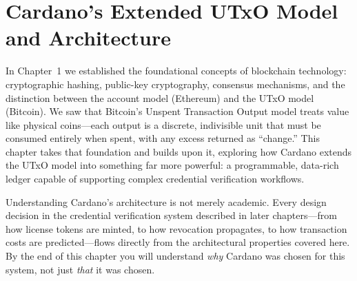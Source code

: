 %
%
%


\chapter{Cardano's Extended UTxO Model and Architecture}
\label{ch:cardano-architecture}

In Chapter~1 we established the foundational concepts of blockchain
technology: cryptographic hashing, public-key cryptography, consensus
mechanisms, and the distinction between the account model (Ethereum) and
the UTxO model (Bitcoin). We saw that Bitcoin's Unspent Transaction
Output model treats value like physical coins---each output is a
discrete, indivisible unit that must be consumed entirely when spent,
with any excess returned as ``change.'' This chapter takes that
foundation and builds upon it, exploring how Cardano extends the UTxO
model into something far more powerful: a programmable, data-rich ledger
capable of supporting complex credential verification workflows.

Understanding Cardano's architecture is not merely academic. Every
design decision in the credential verification system described in later
chapters---from how license tokens are minted, to how revocation
propagates, to how transaction costs are predicted---flows directly from
the architectural properties covered here. By the end of this chapter
you will understand \emph{why} Cardano was chosen for this system, not
just \emph{that} it was chosen.


